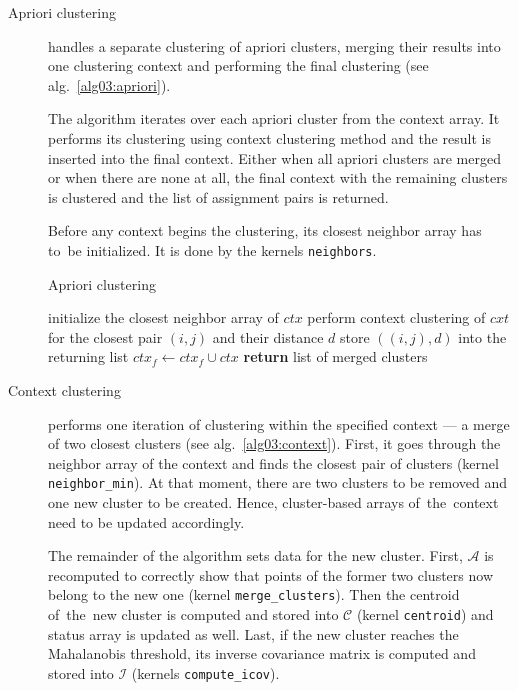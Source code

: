 \begin{description}
	\item[Apriori clustering] handles a separate clustering of apriori clusters, merging their results into one clustering context and performing the final clustering (see alg.~\ref{alg03:apriori}).
	
	The algorithm iterates over each apriori cluster from the context array. It performs its clustering using context clustering method and the result is inserted into the final context. Either when all apriori clusters are merged or when there are none at all, the final context with the remaining clusters is clustered and the list of assignment pairs is returned.
	
	Before any context begins the clustering, its closest neighbor array has to~be initialized. It is done by the kernels \texttt{neighbors}.
	
	
	\begin{algorithm}
		\caption{Apriori clustering}
		\label{alg03:apriori}
		\begin{algorithmic}[1]
			 
			\State initialize the closest neighbor array of $ctx$ 
			\State perform context clustering of $cxt$ for the closest pair $(i,j)$ and their distance $d$
			\State store $((i,j),d)$ into the returning list
			\EndWhile
			\State $ctx_f \gets ctx_f \cup ctx$ 
			\EndFor
			\State \textbf{return} list of merged clusters
			\EndProcedure
		\end{algorithmic}
	\end{algorithm}

	\item[Context clustering] performs one iteration of clustering within the specified context --- a merge of two closest clusters (see alg.~\ref{alg03:context}). First, it goes through the neighbor array of the context and finds the closest pair of clusters (kernel \texttt{neighbor\_min}). At that moment, there are two clusters to be removed and one new cluster to be created. Hence, cluster-based arrays of~the~context need to be updated accordingly.
	
	The remainder of the algorithm sets data for the new cluster. First, $\mathcal{A}$ is recomputed to correctly show that points of the former two clusters now belong to the new one (kernel \texttt{merge\_clusters}). Then the centroid of~the~new cluster is computed and stored into $\mathcal{C}$ (kernel \texttt{centroid}) and status array is updated as well. Last, if the new cluster reaches the Mahalanobis threshold, its inverse covariance matrix is computed and stored into $\mathcal{I}$ (kernels \texttt{compute\_icov}). 
	

\end{description}
